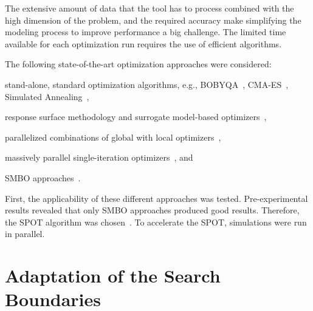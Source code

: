 \documentclass[conference]{IEEEtran}
\begin{document}
The extensive amount of data that the tool has to process combined with the high dimension of the problem, and the required accuracy make simplifying the modeling process to improve performance a big challenge.
The limited time available for each optimization run requires the use of efficient algorithms.

The following state-of-the-art optimization approaches were considered: 
\begin{compactitem}
\item stand-alone, standard optimization algorithms, e.g., BOBYQA~\citep{Powe09a}, CMA-ES~\citep{Hans06a}, Simulated Annealing~\citep{vanL87a},
\item response surface methodology and surrogate model-based optimizers~\citep{Myers2016}, 
\item parallelized  combinations of global with local optimizers~\citet{Good18b},  
\item massively parallel single-iteration optimizers~\citet{Cauw20a}\citet{Rena20a}, and 
\item \gls{SMBO} approaches~\citep{Jin11a}.
\end{compactitem}
First, the applicability of these different approaches  was tested. Pre-experimental results revealed that only \gls{SMBO} approaches produced good results. 
Therefore, the \gls{SPOT} algorithm was chosen~\citep{Bart17parxiv}.
To accelerate the \gls{SPOT}, simulations were run in parallel. 

\section{Adaptation of the Search Boundaries}\label{sec:adaptation}
\end{document}
